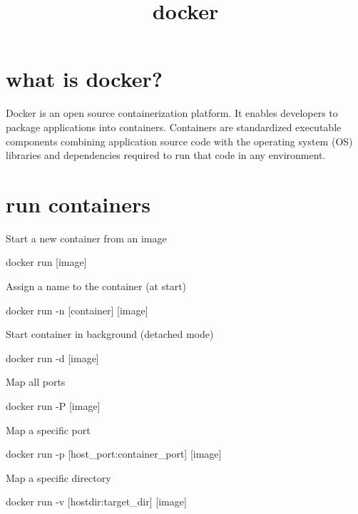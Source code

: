 \documentclass{refcard}
\title{docker}
\begin{document}
\maketitle

\section{what is docker?}

Docker is an open source containerization platform. It enables developers to package applications into containers. Containers are standardized executable components combining application source code with the operating system (OS) libraries and dependencies required to run that code in any environment.\\


\section{run containers}

Start a new container from an image
\begin{ttyenv}
docker run [image]
\end{ttyenv}

Assign a name to the container (at start)
\begin{ttyenv}
docker run -n [container] [image]
\end{ttyenv}

Start container in background (detached mode)
\begin{ttyenv}
docker run -d [image]
\end{ttyenv}

Map all ports
\begin{ttyenv}
docker run -P [image]
\end{ttyenv}

Map a specific port
\begin{ttyenv}
docker run -p [host_port:container_port] [image]
\end{ttyenv}

Map a specific directory
\begin{ttyenv}
docker run -v [hostdir:target_dir] [image]
\end{ttyenv}
\end{document}
